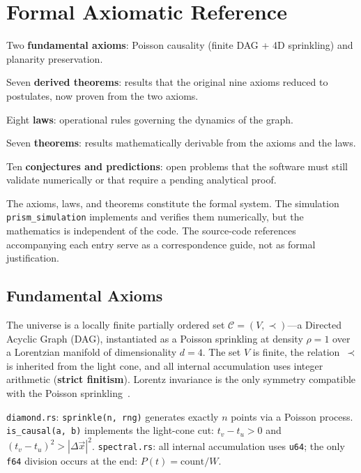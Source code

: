 \appendix

\chapter{Formal Axiomatic Reference}
\label{app:axioms}

\begin{introduction}
  \item Two \textbf{fundamental axioms}: Poisson causality
        (finite DAG + 4D sprinkling) and planarity preservation.
  \item Seven \textbf{derived theorems}: results that the original nine axioms
        reduced to postulates, now proven from
        the two axioms.
  \item Eight \textbf{laws}: operational rules governing the dynamics
        of the graph.
  \item Seven \textbf{theorems}: results mathematically derivable from
        the axioms and the laws.
  \item Ten \textbf{conjectures and predictions}: open problems that the
        software must still validate numerically or that require a
        pending analytical proof.
\end{introduction}

\noindent
The axioms, laws, and theorems constitute the formal system. The
simulation \texttt{prism\_simulation} implements and verifies them
numerically, but the mathematics is independent of the code.
The source-code references accompanying each entry serve
as a correspondence guide, not as formal justification.

\section{Fundamental Axioms}

\begin{axiom}
\label{ax:causal-finitude}
The universe is a locally finite
partially ordered set $\mathcal{C} = (V, \prec)$---a Directed
Acyclic Graph (DAG), instantiated as a Poisson
sprinkling at density $\rho = 1$ over a Lorentzian manifold of
dimensionality $d = 4$. The set $V$ is finite, the
relation~$\prec$ is inherited from the light cone, and all
internal accumulation uses integer arithmetic
(\textbf{strict finitism}). Lorentz invariance is the
only symmetry compatible with the Poisson
sprinkling~\cite{bombelli2009}.

\medskip\noindent
\texttt{diamond.rs}: \texttt{sprinkle(n, rng)} generates exactly
$n$ points via a Poisson process. \texttt{is\_causal(a, b)}
implements the light-cone cut: $t_v - t_u > 0$ and
$(t_v - t_u)^2 > |\Delta\vec{x}|^2$.
\texttt{spectral.rs}: all internal accumulation uses
\texttt{u64}; the only \texttt{f64} division occurs at
the end: $P(t) = \text{count} / W$.
\end{axiom}

